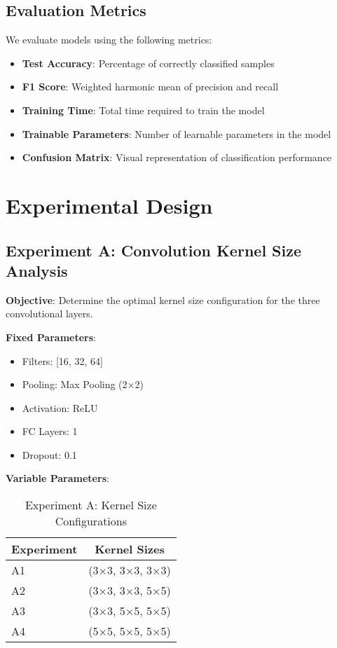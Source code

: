 \documentclass[12pt,a4paper]{article}
\begin{document}
\subsection{Evaluation Metrics}
We evaluate models using the following metrics:
\begin{itemize}
    \item \textbf{Test Accuracy}: Percentage of correctly classified samples
    \item \textbf{F1 Score}: Weighted harmonic mean of precision and recall
    \item \textbf{Training Time}: Total time required to train the model
    \item \textbf{Trainable Parameters}: Number of learnable parameters in the model
    \item \textbf{Confusion Matrix}: Visual representation of classification performance
\end{itemize}

\section{Experimental Design}

\subsection{Experiment A: Convolution Kernel Size Analysis}
\textbf{Objective}: Determine the optimal kernel size configuration for the three convolutional layers.

\textbf{Fixed Parameters}:
\begin{itemize}
    \item Filters: [16, 32, 64]
    \item Pooling: Max Pooling (2×2)
    \item Activation: ReLU
    \item FC Layers: 1
    \item Dropout: 0.1
\end{itemize}

\textbf{Variable Parameters}:
\begin{table}[H]
\centering
\caption{Experiment A: Kernel Size Configurations}
\begin{tabular}{lc}
\toprule
\textbf{Experiment} & \textbf{Kernel Sizes} \\
\midrule
A1 & (3×3, 3×3, 3×3) \\
A2 & (3×3, 3×3, 5×5) \\
A3 & (3×3, 5×5, 5×5) \\
A4 & (5×5, 5×5, 5×5) \\
\bottomrule
\end{tabular}
\end{table}
\end{document}
